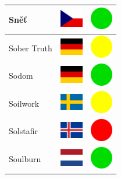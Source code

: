 \documentclass[12pt, a4paper, twoside]{report}
\begin{document}
\begin{center}
\begin{longtable}{|p{5cm}|p{2cm}|p{2cm}|}
 Sněť                                                       & \includegraphics[width=1cm]{../4x3/cz} &   \includegraphics[width=1cm]{../likes/y} \\ \hline
 Sober Truth                                                & \includegraphics[width=1cm]{../4x3/de} &   \includegraphics[width=1cm]{../likes/m} \\ \hline
 Sodom                                                      & \includegraphics[width=1cm]{../4x3/de} &   \includegraphics[width=1cm]{../likes/y} \\ \hline
 Soilwork                                                   & \includegraphics[width=1cm]{../4x3/se} &   \includegraphics[width=1cm]{../likes/m} \\ \hline
 Solstafir                                                  & \includegraphics[width=1cm]{../4x3/is} &   \includegraphics[width=1cm]{../likes/n} \\ \hline
 Soulburn                                                   & \includegraphics[width=1cm]{../4x3/nl} &   \includegraphics[width=1cm]{../likes/y} \\ \hline

\end{longtable}
\end{center}
\end{document}
